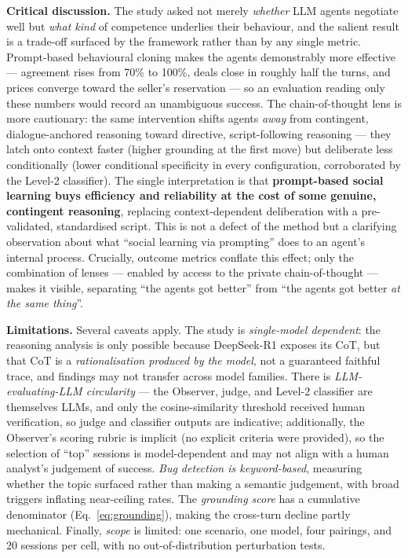 \documentclass[pdflatex,sn-mathphys-num]{sn-jnl}%
\theoremstyle{thmstyleone}%
\theoremstyle{thmstyletwo}%
\theoremstyle{thmstylethree}%
\begin{document}
\textbf{Critical discussion.} The study asked not merely \emph{whether} LLM agents negotiate well but \emph{what kind} of competence underlies their behaviour, and the salient result is a trade-off surfaced by the framework rather than by any single metric. Prompt-based behavioural cloning makes the agents demonstrably more effective --- agreement rises from 70\% to 100\%, deals close in roughly half the turns, and prices converge toward the seller's reservation --- so an evaluation reading only these numbers would record an unambiguous success. The chain-of-thought lens is more cautionary: the same intervention shifts agents \emph{away} from contingent, dialogue-anchored reasoning toward directive, script-following reasoning --- they latch onto context faster (higher grounding at the first move) but deliberate less conditionally (lower conditional specificity in every configuration, corroborated by the Level-2 classifier). The single interpretation is that \textbf{prompt-based social learning buys efficiency and reliability at the cost of some genuine, contingent reasoning}, replacing context-dependent deliberation with a pre-validated, standardised script. This is not a defect of the method but a clarifying observation about what ``social learning via prompting'' does to an agent's internal process. Crucially, outcome metrics conflate this effect; only the combination of lenses --- enabled by access to the private chain-of-thought --- makes it visible, separating ``the agents got better'' from ``the agents got better \emph{at the same thing}''.

\textbf{Limitations.} Several caveats apply. The study is \emph{single-model dependent}: the reasoning analysis is only possible because DeepSeek-R1 exposes its CoT, but that CoT is a \emph{rationalisation produced by the model}, not a guaranteed faithful trace, and findings may not transfer across model families. There is \emph{LLM-evaluating-LLM circularity} --- the Observer, judge, and Level-2 classifier are themselves LLMs, and only the cosine-similarity threshold received human verification, so judge and classifier outputs are indicative; additionally, the Observer's scoring rubric is implicit (no explicit criteria were provided), so the selection of ``top'' sessions is model-dependent and may not align with a human analyst's judgement of success. \emph{Bug detection is keyword-based}, measuring whether the topic surfaced rather than making a semantic judgement, with broad triggers inflating near-ceiling rates. The \emph{grounding score} has a cumulative denominator (Eq.~\ref{eq:grounding}), making the cross-turn decline partly mechanical. Finally, \emph{scope} is limited: one scenario, one model, four pairings, and 20 sessions per cell, with no out-of-distribution perturbation tests.
\end{document}
